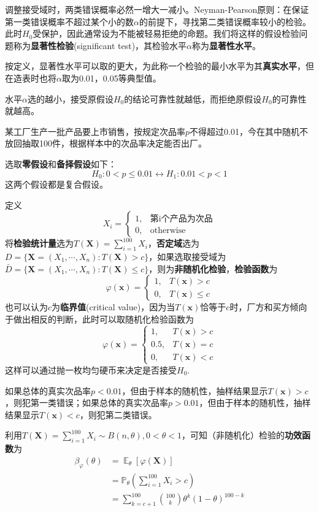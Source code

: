 \documentclass{ctexbook}
\DeclareMathOperator{\E}{\mathbb{E}}     %
\begin{document}
调整接受域时，两类错误概率必然一增大一减小。Neyman-Pearson原则：在保证第一类错误概率不超过某个小的数$\alpha$的前提下，寻找第二类错误概率较小的检验。此时$H_0$受保护，因此通常设为不能被轻易拒绝的命题。我们将这样的假设检验问题称为\textbf{显著性检验}(significant test)，其检验水平$\alpha$称为\textbf{显著性水平}。

按定义，显著性水平可以取的更大，为此称一个检验的最小水平为其\textbf{真实水平}，但在造表时也将$\alpha$取为0.01，0.05等典型值。

水平$\alpha$选的越小，接受原假设$H_0$的结论可靠性就越低，而拒绝原假设$H_0$的可靠性就越高。

\begin{example}
    某工厂生产一批产品要上市销售，按规定次品率$p$不得超过0.01，今在其中随机不放回抽取100件，根据样本中的次品率决定能否出厂。

    选取\textbf{零假设}和\textbf{备择假设}如下：
    $$H_0:0<p\le 0.01\leftrightarrow H_1:0.01<p<1$$
    这两个假设都是复合假设。

    定义
    $$X_i=\begin{cases}
        1,&\text{第i个产品为次品}\\
        0,&\text{otherwise}
    \end{cases}$$
    将\textbf{检验统计量}选为$T(\mathbf{X})=\sum_{i=1}^{100} X_i$，\textbf{否定域}选为$D=\{\mathbf{X}=(X_1,\cdots,X_n):T(\mathbf{X})>c\}$，如果选取接受域为$\bar{D}=\{\mathbf{X}=(X_1,\cdots,X_n):T(\mathbf{X})\le c\}$，则为\textbf{非随机化检验}，\textbf{检验函数}为
    $$\varphi(\mathbf{x})=\begin{cases}
        1,&T(\mathbf{x})>c\\
        0,&T(\mathbf{x})\le c
    \end{cases}$$
    也可以认为$c$为\textbf{临界值}(critical value)，因为当$T(\mathbf{x})$恰等于$c$时，厂方和买方倾向于做出相反的判断，此时可以取随机化检验函数为
    $$\varphi(\mathbf{x})=\begin{cases}
        1,&T(\mathbf{x})>c\\
        0.5,&T(\mathbf{x})=c\\
        0,&T(\mathbf{x})<c
    \end{cases}$$
    这样可以通过抛一枚均匀硬币来决定是否接受$H_0$.

    如果总体的真实次品率$p<0.01$，但由于样本的随机性，抽样结果显示$T(\mathbf{x})>c$，则犯第一类错误；如果总体的真实次品率$p>0.01$，但由于样本的随机性，抽样结果显示$T(\mathbf{x})<c$，则犯第二类错误。

    利用$T(\mathbf{X})=\sum_{i=1}^{100} X_i\sim B(n,\theta),0<\theta<1$，可知（非随机化）检验的\textbf{功效函数}为
    \begin{align*}
        \beta_\varphi(\theta)&=\E_\theta[\varphi(\mathbf{X})]\\
        &=\mathbb{P}_\theta\left(\sum_{i=1}^{100}X_i>c\right)\\
        &=\sum_{k=c+1}^{100}\binom{100}{k}\theta^k(1-\theta)^{100-k}
    \end{align*}
\end{example}
\end{document}
